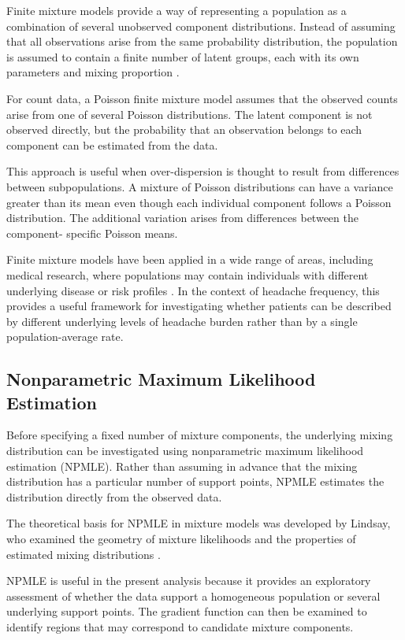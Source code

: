 Finite mixture models provide a way of representing a population as
a combination of several unobserved component distributions. Instead
of assuming that all observations arise from the same probability
distribution, the population is assumed to contain a finite number
of latent groups, each with its own parameters and mixing proportion
\citep{McLachlanPeel2000}.

For count data, a Poisson finite mixture model assumes that the
observed counts arise from one of several Poisson distributions. The
latent component is not observed directly, but the probability that
an observation belongs to each component can be estimated from the
data.

This approach is useful when over-dispersion is thought to result
from differences between subpopulations. A mixture of Poisson
distributions can have a variance greater than its mean even though
each individual component follows a Poisson distribution. The
additional variation arises from differences between the component-
specific Poisson means.

Finite mixture models have been applied in a wide range of areas,
including medical research, where populations may contain individuals
with different underlying disease or risk profiles
\citep{McLachlanPeel2000}. In the context of headache frequency, this
provides a useful framework for investigating whether patients can be
described by different underlying levels of headache burden rather
than by a single population-average rate.


\subsection{Nonparametric Maximum Likelihood Estimation}

Before specifying a fixed number of mixture components, the
underlying mixing distribution can be investigated using
nonparametric maximum likelihood estimation (NPMLE). Rather than
assuming in advance that the mixing distribution has a particular
number of support points, NPMLE estimates the distribution directly
from the observed data.

The theoretical basis for NPMLE in mixture models was developed by
Lindsay, who examined the geometry of mixture likelihoods and the
properties of estimated mixing distributions
\citep{Lindsay1983,Lindsay1983b}.

NPMLE is useful in the present analysis because it provides an
exploratory assessment of whether the data support a homogeneous
population or several underlying support points. The gradient
function can then be examined to identify regions that may correspond
to candidate mixture components.


